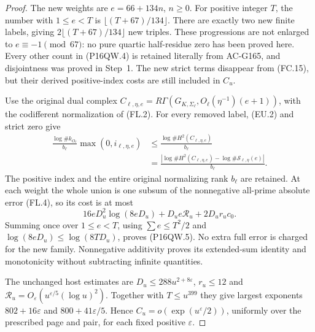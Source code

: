 \begin{proof}
The new weights are $e=66+134n$, $n\geq0$.
For positive integer $T$, the number with $1\leq e<T$ is
$\lfloor(T+67)/134\rfloor$.
There are exactly two new finite labels, giving
$2\lfloor(T+67)/134\rfloor$ new triples.
These progressions are not enlarged to $e\equiv-1\pmod{67}$:
no pure quartic half-residue zero has been proved here.
Every other count in (P16QW.4) is retained literally from AC-G165,
and disjointness was proved in Step~1.
The new strict terms disappear from (FC.15), but their derived
positive-index costs are still included in $C_u$.

Use the original dual complex
$C_{\ell,\eta,e}=R\Gamma(G_{K,\Sigma_\ell},
O_\ell(\eta^{-1})(e+1))$, with the codifferent normalization
of (FL.2).  For every removed label, (EU.2) and strict zero give
\[
 \begin{aligned}
 \frac{\log\#k_{O_\ell}}{b_\ell}\max(0,i_{\ell,\eta,e})
 &\leq\frac{\log\#H^2(C_{\ell,\eta,e})}{b_\ell}\\
 &=\frac{|\log\#H^2(C_{\ell,\eta,e})
                  -\log\#\mathcal S_{\ell,\eta}(e)|}{b_\ell}.
 \end{aligned}
 \tag{P16QW.7}
\]
The positive index and the entire original normalizing rank
$b_\ell$ are retained.  At each weight the whole union is one
subsum of the nonnegative all-prime absolute error (FL.4),
so its cost is at most
\[
                  16eD_u^2\log(8eD_u)+D_ue\mathcal R_u+2D_ur_uc_0.
 \tag{P16QW.8}
\]
Summing once over $1\leq e<T$, using $\sum e\leq T^2/2$
and $\log(8eD_u)\leq\log(8TD_u)$, proves (P16QW.5).
No extra full error is charged for the new family.
Nonnegative additivity proves its extended-sum identity and
monotonicity without subtracting infinite quantities.

The unchanged host estimates are $D_u\leq288u^{2+8\varepsilon}$,
$r_u\leq12$ and
$\mathcal R_u=O_\varepsilon(u^{\varepsilon/5}(\log u)^2)$.
Together with $T\leq u^{399}$ they give largest exponents
$802+16\varepsilon$ and $800+41\varepsilon/5$.
Hence $C_u=o(\exp(u^\varepsilon/2))$, uniformly over the
prescribed page and pair, for each fixed positive $\varepsilon$.


\end{proof}
